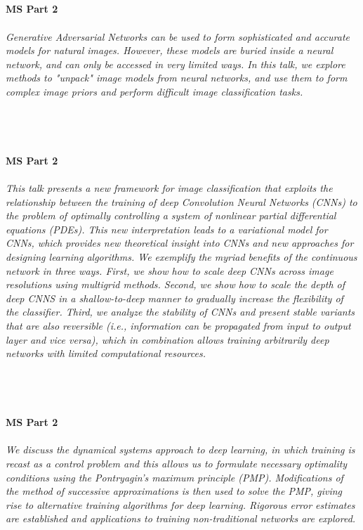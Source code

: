 \begin{multicols}{2}
\\ 
    \\
    \\\\
    \noindent\textbf{MS Part 2}\\
\\  
    \textit{Generative Adversarial Networks can be used to form sophisticated and accurate models for natural images. However, these models are buried inside a neural network, and can only be accessed in very limited ways.  In this talk, we explore methods to "unpack" image models from neural networks, and use them to form complex image priors and perform difficult image classification tasks. }\\
\\ 
    \\
    \\\\
    \noindent\textbf{MS Part 2}\\
\\  
    \textit{This talk presents a new framework for image classification that exploits the relationship between the training of deep Convolution Neural Networks (CNNs) to the problem of optimally controlling a system of nonlinear partial differential equations (PDEs). This new interpretation leads to a variational model for CNNs, which provides new theoretical insight into CNNs and new approaches for designing learning algorithms. We exemplify the myriad benefits of the continuous network in three ways. First, we show how to scale deep CNNs across image resolutions using multigrid methods. Second, we show how to scale the depth of deep CNNS in a shallow-to-deep manner to gradually increase the flexibility of the classifier. Third, we analyze the stability of CNNs and present stable variants that are also reversible (i.e., information can be propagated from input to output layer and vice versa), which in combination allows training arbitrarily deep networks with limited computational resources.}\\
\\ 
    \\
    \\\\
    \noindent\textbf{MS Part 2}\\
\\  
    \textit{We discuss the dynamical systems approach to deep learning, in which training is recast as a control problem and this allows us to formulate necessary optimality conditions using the Pontryagin’s maximum principle (PMP). Modifications of the method of successive approximations is then used to solve the PMP, giving rise to alternative training algorithms for deep learning. Rigorous error estimates are established and applications to training non-traditional networks are explored. }\\

\end{multicols}
